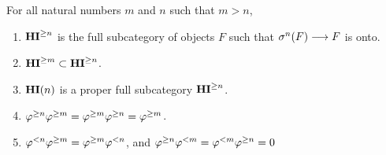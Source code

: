 \begin{prop}\label{prop_THI_properties}
For all natural numbers $m$ and $n$ such that $m > n$,

\begin{enumerate}
\item $\mathbf{HI}^{\geq n}$ is the full subcategory of objects $F$ such that 
$\sigma^{n}(F) \longrightarrow F$ is onto.
\tinyskip

\item $\mathbf{HI}^{\geq m} \subset \mathbf{HI}^{\geq n}$.
\tinyskip

\item $\mathbf{HI}(n)$ is a proper full subcategory $\mathbf{HI}^{\geq n}$.
\tinyskip

\item $\varphi^{\geq n}\varphi^{\geq m} = \varphi^{\geq m}\varphi^{\geq n} = \varphi^{\geq m}$.
\tinyskip

\item $\varphi^{< n}\varphi^{\geq m} = \varphi^{\geq m}\varphi^{< n}$, and $\varphi^{\geq n}\varphi^{< m} 
= \varphi^{< m}\varphi^{\geq n} = 0$ 
\tinyskip
\end{enumerate}
\end{prop}

